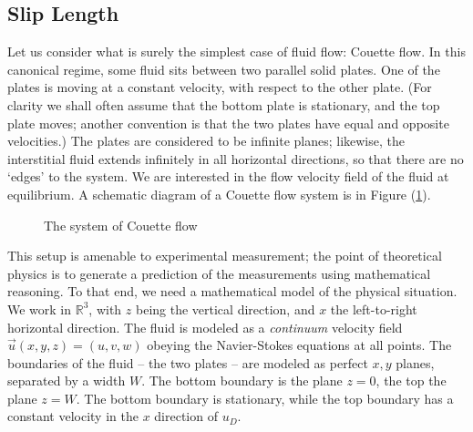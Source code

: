 \documentclass[12pt, a4paper, twoside, openright]{book}
\begin{document}
\subsection*{Slip Length}

Let us consider what is surely the simplest case of fluid flow: Couette flow.  In this canonical regime, some fluid sits between two parallel solid plates. One of the plates is moving at a constant velocity, with respect to the other plate. (For clarity we shall often assume that the bottom plate is stationary, and the top plate moves; another convention is that the two plates have equal and opposite velocities.) The plates are considered to be infinite planes; likewise, the interstitial fluid extends infinitely in all horizontal directions, so that there are no `edges' to the system. We are interested in the flow velocity field of the fluid at equilibrium.  A schematic diagram of a Couette flow system is in Figure (\ref{Couettesystem}).
\clearpage

\begin{figure}[ht]
\centering
{}
\caption{The system of Couette flow} \label{Couettesystem}
\end{figure}

This setup is amenable to experimental measurement; the point of theoretical physics is to generate a prediction of the measurements using mathematical reasoning.  To that end, we need a mathematical model of the physical situation.
We work in $\mathbb{R}^{3}$, with $z$ being the vertical direction, and $x$ the left-to-right horizontal direction. The fluid is modeled as a \emph{continuum} velocity field $\vec{u}(x,y,z) = (u,v,w) $ obeying the Navier-Stokes equations at all points. The boundaries of the fluid -- the two plates -- are modeled as perfect $x,y$ planes, separated by a width $W$. The bottom boundary is the plane $z=0$, the top the plane $z=W$.
The bottom boundary is stationary, while the top boundary has a constant velocity in the $x$ direction of $u_{D}$.
\end{document}
